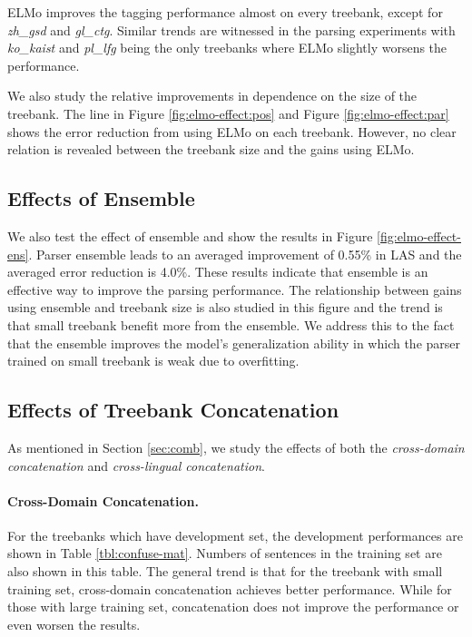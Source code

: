 \documentclass[11pt,a4paper]{article}
\begin{document}
ELMo improves the tagging performance almost on every treebank,
except for \textit{zh\_gsd} and \textit{gl\_ctg}.
Similar trends are witnessed in the parsing experiments with \textit{ko\_kaist}
and \textit{pl\_lfg} being the only treebanks where ELMo slightly worsens the performance.

We also study the relative improvements in dependence on the size of the treebank.
The line in Figure \ref{fig:elmo-effect:pos} and Figure \ref{fig:elmo-effect:par}
shows the error reduction from using ELMo on each treebank.
However, no clear relation is revealed between the treebank size and the gains using ELMo.

\subsection{Effects of Ensemble}

We also test the effect of ensemble and show
the results in Figure \ref{fig:elmo-effect-ens}.
Parser ensemble leads to an averaged improvement of 0.55\% in LAS
and the averaged error reduction is 4.0\%.
These results indicate that ensemble is an effective way to
improve the parsing performance.
The relationship between gains using ensemble and treebank size
is also studied in this figure and the trend is that small treebank benefit more
from the ensemble.
We address this to the fact that the ensemble improves the model's generalization
ability in which the parser trained on small treebank is weak due to overfitting.

\subsection{Effects of Treebank Concatenation}\label{sec:treebank-concat}
As mentioned in Section \ref{sec:comb},
we study the effects of both the \textit{cross-domain concatenation} and \textit{cross-lingual concatenation}.
\paragraph{Cross-Domain Concatenation.}


For the treebanks which have development set, the development performances
are shown in Table \ref{tbl:confuse-mat}.
Numbers of sentences in the training set are also shown in this table.
The general trend is that for the treebank with small training set,
cross-domain concatenation achieves better performance.
While for those with large training set, concatenation does not improve
the performance or even worsen the results.
\end{document}
